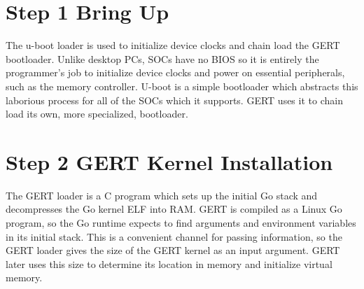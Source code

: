 

\section{Step 1 Bring Up}
The u-boot loader is used to initialize device clocks and chain load the GERT bootloader.
Unlike desktop PCs, SOCs have no BIOS so it is entirely the programmer's job to initialize device clocks
and power on essential peripherals, such as the memory controller. U-boot is a simple bootloader which abstracts
this laborious process for all of the SOCs which it supports. GERT uses it to chain load its own, more specialized,
bootloader.


\section{Step 2 GERT Kernel Installation}
The GERT loader is a C program which sets up the initial Go stack and decompresses the Go kernel
ELF into RAM. GERT is compiled as a Linux Go program, so the Go runtime expects to find arguments
and environment variables in its initial stack. This is a convenient channel for passing
information, so the GERT loader gives the size of the GERT kernel as an input argument. GERT later uses this
size to determine its location in memory and initialize virtual memory.


